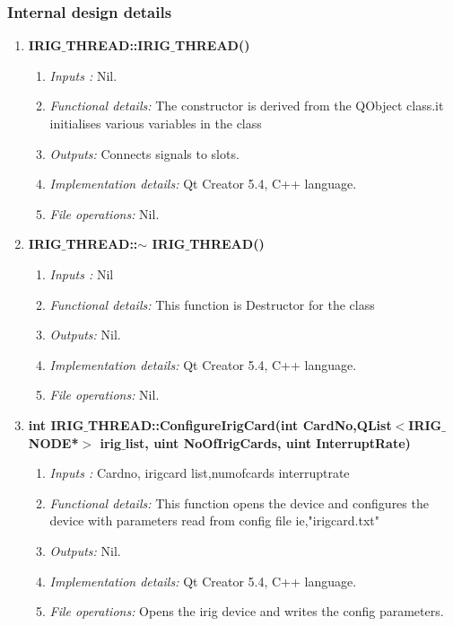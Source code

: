 \subsubsection{Internal design details }
\begin{enumerate}
	\item  \textbf{IRIG$\_$THREAD::IRIG$\_$THREAD()}
	\begin{enumerate}
		\item \textit{Inputs :} Nil.
		\item \textit{Functional details:} The constructor is derived from the QObject class.it initialises various variables in the class 
		\item \textit{Outputs:} Connects signals to slots.
		\item \textit{Implementation details:} Qt Creator 5.4, C++ language.
		\item \textit{File operations:} Nil.
	\end{enumerate}

\item  \textbf{IRIG$\_$THREAD::$\sim$ IRIG$\_$THREAD()}
\begin{enumerate}
	\item \textit{Inputs :} Nil
	\item \textit{Functional details:} This function is Destructor for the class
	\item \textit{Outputs:} Nil.
	\item \textit{Implementation details:} Qt Creator 5.4, C++ language.
	\item \textit{File operations:} Nil.
\end{enumerate}
\item  \textbf{int IRIG$\_$THREAD::ConfigureIrigCard(int CardNo,QList$<$IRIG$\_$NODE*$>$ irig$\_$list, uint NoOfIrigCards, uint InterruptRate)}
\begin{enumerate}
	\item \textit{Inputs :} Cardno, irigcard list,numofcards interruptrate
	\item \textit{Functional details:} This function opens the device and configures the device with parameters read from config file ie,"irigcard.txt"
	\item \textit{Outputs:} Nil.
	\item \textit{Implementation details:} Qt Creator 5.4, C++ language.
	\item \textit{File operations:} Opens the irig device  and writes the config parameters.
\end{enumerate}


\end{enumerate}
